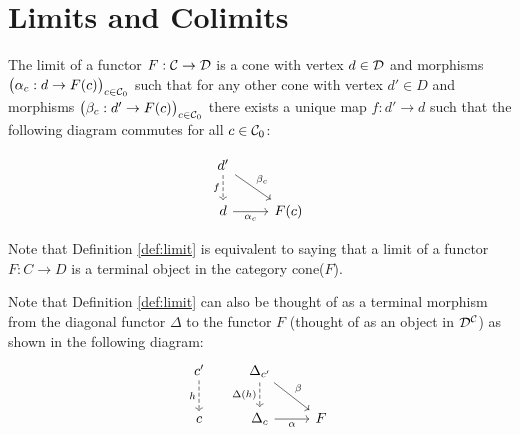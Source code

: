 \section{Limits and Colimits}

\begin{definition}
	The limit of a functor $F:\mathcal{C}\to \mathcal{D}$ is a cone with vertex $d\in \mathcal{D}$ and
	morphisms $\big(\alpha_c: d \to F(c)\big)_{c\in \mathcal{C}_0}$ such that for any other
	cone with vertex $d'\in D$ and morphisms $\big(\beta_c: d' \to F(c)\big)_{c\in
	\mathcal{C}_0}$ there exists a unique map $f:d'\to d$ such that the following diagram
	commutes for all $c\in \mathcal{C}_0$: \parencite{leinster:basic_category_theory}

	\[\begin{tikzcd}
		{d'} \\
		d & {F(c)}
		\arrow["{\alpha_c}"', from=2-1, to=2-2]
		\arrow["{\beta_c}", from=1-1, to=2-2]
		\arrow["f"', dashed, from=1-1, to=2-1]
	\end{tikzcd}\]
\end{definition}

\begin{remark}
	Note that Definition \ref{def:limit} is equivalent to saying that a limit of a
	functor $F:C\to D$ is a terminal object in the category cone($F$).
\end{remark}

\begin{remark}
	Note that Definition \ref{def:limit} can also be thought of as a terminal
	morphism from the diagonal functor $\Delta$ to the functor $F$ (thought of as
	an object in $\mathcal{D}^{\mathcal{C}}$) as shown in the following diagram:
	\[\begin{tikzcd}[ampersand replacement=\&]
		{c'} \& {\Delta_{c'}} \\
		c \& {\Delta_c} \& F
		\arrow["h"', dashed, from=1-1, to=2-1]
		\arrow["{\Delta(h)}"', dashed, from=1-2, to=2-2]
		\arrow["\beta", from=1-2, to=2-3]
		\arrow["\alpha"', from=2-2, to=2-3]
	\end{tikzcd}\]
\end{remark}

